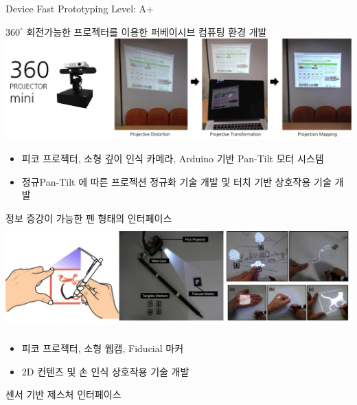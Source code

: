 \begin{cventries}
  \cventry
    {Device Fast Prototyping} %
    {} %
    {} %
    {Level: A+} %
    {
      \begin{cvitems} %
        \item {$360^{\circ}$ 회전가능한 프로젝터를 이용한 퍼베이시브 컴퓨팅 환경 개발 \\
          \includegraphics[width=\linewidth]{resources/pervasiveAR.png}
          \begin{itemize}
              \item {피코 프로젝터, 소형 깊이 인식 카메라, Arduino 기반 Pan-Tilt 모터 시스템}
              \item {정규Pan-Tilt 에 따른 프로젝션 정규화 기술 개발 및 터치 기반 상호작용 기술 개발}
          \end{itemize}
        }
        \item {정보 증강이 가능한 펜 형태의 인터페이스 \\
          \includegraphics[width=\linewidth, height=40mm]{resources/augpen.png}
          \begin{itemize}
            \item {피코 프로젝터, 소형 웹캠, Fiducial 마커}
            \item {2D 컨텐츠 및 손 인식 상호작용 기술 개발}
          \end{itemize}
        }
        \item {센서 기반 제스처 인터페이스 \\
}
\end{cvitems}}
\end{cventries}
